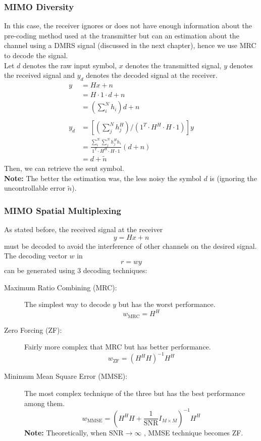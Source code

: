 \subsubsection{MIMO Diversity}
In this case, the receiver ignores or does not have enough information about the pre-coding method used at the transmitter but can an estimation about the channel using a DMRS signal (discussed in the next chapter), hence we use MRC to decode the signal. \\
Let $d$ denotes the raw input symbol, $x$ denotes the transmitted signal, $y$ denotes the received signal and $y_d$ denotes the decoded signal at the receiver.
\begin{equation}
    \label{eq: MIMO div using MRC}
    \begin{aligned}
        y &= Hx + n \\
        &= H \cdot 1 \cdot d + n \\
        &= \left( \sum_i^N h_i \right) d + n \\
        \\
        y_d &= \left[ \left( \sum_j^N h^H_j \right) / \left( 1^T \cdot H^H \cdot H \cdot 1 \right) \right] y \\
        &= \frac{ \sum_i^N \sum_j^N h^H_j h_i }{1^T \cdot H^H \cdot H \cdot 1} (d + n) \\
        &= d + \tilde{n}
    \end{aligned}
\end{equation}
Then, we can retrieve the sent symbol.\\
\textbf{Note:} The better the estimation was, the less noisy the symbol $d$ is (ignoring the uncontrollable error $\tilde{n}$).
\subsubsection{MIMO Spatial Multiplexing}
As stated before, the received signal at the receiver \[ y = Hx + n \] must be decoded to avoid the interference of other channels on the desired signal. The decoding vector $w$ in \[ r = w y \] can be generated using 3 decoding techniques:
\begin{description}
    \item[Maximum Ratio Combining (MRC):] The simplest way to decode $y$ but has the worst performance. \[ w_{\text{MRC}} = H^H \]
    \item[Zero Forcing (ZF):] Fairly more complex that MRC but has better performance. \[ w_{\text{ZF}} = \left(H^H H\right)^{-1} H^H \]
    \item[Minimum Mean Square Error (MMSE):] The most complex technique of the three but has the best performance among them. \[ w_{\text{MMSE}} = \left(H^H H + \frac{1}{\text{SNR}} I_{M \times M} \right)^{-1} H^H \]\textbf{Note:} Theoretically, when $\text{SNR} \rightarrow \infty$ , MMSE technique becomes ZF. 
\end{description}